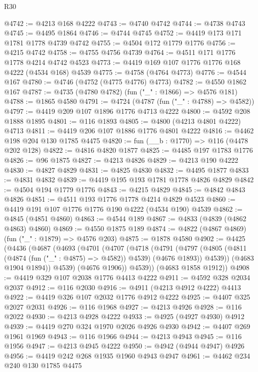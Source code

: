 \begin{lexlean}{R30}
\begin{coremodule}
@4742 := @4213 @168 @4222
@4743 := @4740 @4742
@4744 := @4738 @4743
@4745 := @4495 @1864
@4746 := @4744 @4745
@4752 := @4419 @173 @171 @1781 @1778 @4739 @4742
@4755 := @4504 @172 @1779 @1776
@4756 := @4215 @4742
@4758 := @4755 @4756 @4739
@4764 := @4511 @171 @1776 @1778 @4214 @4742 @4523
@4773 := @4419 @169 @107 @1776 @1776 @168 @4222 (@4534 @168) @4539
@4775 := @4758 (@4764 @4773)
@4776 := @4544 @167
@4780 := @4746 (@4752 (@4775 @4776) @4773)
@4782 := @4550 @1862 @167
@4787 := @4735 (@4780 @4782) (fun ("_" : @1866) => @4576 @181)
@4788 := @1865 @4580
@4791 := @4724 (@4787 (fun ("_" : @4788) => @4582))
@4797 := @4419 @209 @107 @1896 @1776 @4713 @4222
@4800 := @4592 @208 @1888 @1895
@4801 := @116 @1893
@4805 := @4800 (@4213 @4801 @4222) @4713
@4811 := @4419 @206 @107 @1886 @1776 @4801 @4222
@4816 := @4462 @198 @204 @130 @1785 @4475
@4820 := fun (__b : @1770) => @116 (@4478 @202 @128)
@4822 := @4816 @4820 @1877
@4825 := @4485 @197 @1783 @1776
@4826 := @96 @1875
@4827 := @4213 @4826
@4829 := @4213 @190 @4222
@4830 := @4827 @4829
@4831 := @4825 @4830
@4832 := @4495 @1877
@4833 := @4831 @4832
@4839 := @4419 @195 @193 @1781 @1778 @4826 @4829
@4842 := @4504 @194 @1779 @1776
@4843 := @4215 @4829
@4845 := @4842 @4843 @4826
@4851 := @4511 @193 @1776 @1778 @4214 @4829 @4523
@4860 := @4419 @191 @107 @1776 @1776 @190 @4222 (@4534 @190) @4539
@4862 := @4845 (@4851 @4860)
@4863 := @4544 @189
@4867 := @4833 (@4839 (@4862 @4863) @4860)
@4869 := @4550 @1875 @189
@4874 := @4822 (@4867 @4869) (fun ("_" : @1879) => @4576 @203)
@4875 := @1878 @4580
@4902 := @4425
    (@4436
      (@4687
        (@4693
          (@4701
            (@4707
              (@4718
                (@4791
                  (@4797
                    (@4805 (@4811 (@4874 (fun ("_" : @4875) => @4582)) @4539) (@4676 @1893))
                    @4539))
                (@4683 @1904 @1894))
              @4539)
            (@4676 @1906))
          @4539))
      (@4683 @1858 @1912))
@4908 := @4419 @329 @107 @2038 @1776 @4413 @4222
@4911 := @4592 @328 @2034 @2037
@4912 := @116 @2030
@4916 := @4911 (@4213 @4912 @4222) @4413
@4922 := @4419 @326 @107 @2032 @1776 @4912 @4222
@4925 := @4407 @325 @2027 @2031
@4926 := @116 @1968
@4927 := @4213 @4926
@4928 := @116 @2022
@4930 := @4213 @4928 @4222
@4933 := @4925 (@4927 @4930) @4912
@4939 := @4419 @270 @324 @1970 @2026 @4926 @4930
@4942 := @4407 @269 @1961 @1969
@4943 := @116 @1966
@4944 := @4213 @4943
@4945 := @116 @1956
@4947 := @4213 @4945 @4222
@4950 := @4942 (@4944 @4947) @4926
@4956 := @4419 @242 @268 @1935 @1960 @4943 @4947
@4961 := @4462 @234 @240 @130 @1785 @4475

\end{coremodule}
\end{lexlean}
